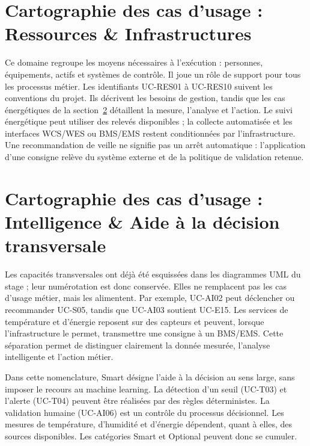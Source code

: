 


\section{Cartographie des cas d’usage  :  Ressources \& Infrastructures}

\label{sec:3.7}

Ce domaine regroupe les moyens nécessaires à l’exécution : personnes, équipements, actifs et systèmes de contrôle. Il joue un rôle de support pour tous les processus métier. Les identifiants UC-RES01 à UC-RES10 suivent les conventions du projet. Ils décrivent les besoins de gestion, tandis que les cas énergétiques de la section~\ref{sec:3.8} détaillent la mesure, l’analyse et l’action. Le suivi énergétique peut utiliser des relevés disponibles ; la collecte automatisée et les interfaces WCS/WES ou BMS/EMS restent conditionnées par l’infrastructure. Une recommandation de veille ne signifie pas un arrêt automatique : l’application d’une consigne relève du système externe et de la politique de validation retenue.





\section{Cartographie des cas d’usage  :  Intelligence \& Aide à la décision transversale}

\label{sec:3.8}

Les capacités transversales ont déjà été esquissées dans les diagrammes UML du stage ; leur numérotation est donc conservée. Elles ne remplacent pas les cas d’usage métier, mais les alimentent. Par exemple, UC-AI02 peut déclencher ou recommander UC-S05, tandis que UC-AI03 soutient UC-E15. Les services de température et d’énergie reposent sur des capteurs et peuvent, lorsque l’infrastructure le permet, transmettre une consigne à un BMS/EMS. Cette séparation permet de distinguer clairement la donnée mesurée, l’analyse intelligente et l’action métier.




Dans cette nomenclature, Smart désigne l’aide à la décision au sens large, sans imposer le recours au machine learning. La détection d’un seuil (UC-T03) et l’alerte (UC-T04) peuvent être réalisées par des règles déterministes. La validation humaine (UC-AI06) est un contrôle du processus décisionnel. Les mesures de température, d’humidité et d’énergie dépendent, quant à elles, des sources disponibles. Les catégories Smart et Optional peuvent donc se cumuler.

